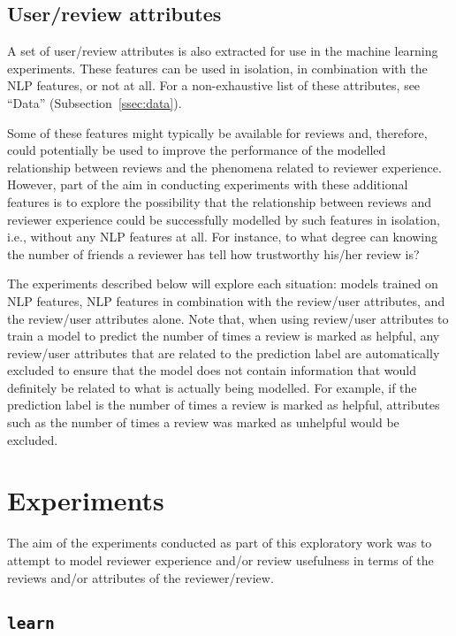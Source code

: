 \documentclass[9pt]{article}
\begin{document}
\subsection{User/review attributes}
\label{ssec:attributes}

A set of user/review attributes is also extracted for use in the machine learning experiments. These features can be used in isolation, in combination with the NLP features, or not at all. For a non-exhaustive list of these attributes, see ``Data'' (Subsection~\ref{ssec:data}).

Some of these features might typically be available for reviews and, therefore, could potentially be used to improve the performance of the modelled relationship between reviews and the phenomena related to reviewer experience. However, part of the aim in conducting experiments with these additional features is to explore the possibility that the relationship between reviews and reviewer experience could be successfully modelled by such features in isolation, i.e., without any NLP features at all. For instance, to what degree can knowing the number of friends a reviewer has tell how trustworthy his/her review is?

The experiments described below will explore each situation: models trained on NLP features, NLP features in combination with the review/user attributes, and the review/user attributes alone. Note that, when using review/user attributes to train a model to predict the number of times a review is marked as helpful, any review/user attributes that are related to the prediction label are automatically excluded to ensure that the model does not contain information that would definitely be related to what is actually being modelled. For example, if the prediction label is the number of times a review is marked as helpful, attributes such as the number of times a review was marked as unhelpful would be excluded.

\section{Experiments}
\label{sec:experiments}

The aim of the experiments conducted as part of this exploratory work was to attempt to model reviewer experience and/or review usefulness in terms of the reviews and/or attributes of the reviewer/review.

\subsection{{\tt learn}}
\label{ssec:learn}
\end{document}
